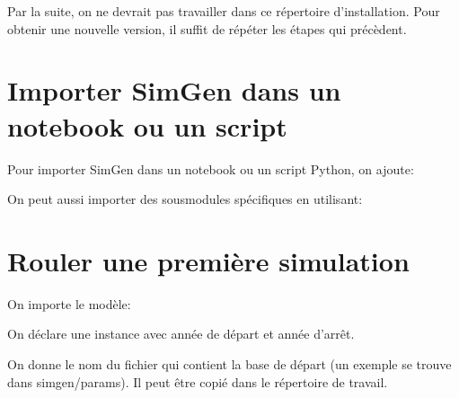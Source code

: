 \documentclass[letterpaper,10pt,french]{sphinxmanual}
\begin{document}
Par la suite, on ne devrait pas travailler dans ce répertoire d’installation. Pour obtenir une nouvelle version, il suffit de répéter les étapes qui précèdent.


\section{Importer SimGen dans un notebook ou un script}
\label{\detokenize{premierpas:importer-simgen-dans-un-notebook-ou-un-script}}
Pour importer SimGen dans un notebook ou un script Python, on ajoute:

\begin{sphinxVerbatim}[commandchars=\\\{\}]
 
\end{sphinxVerbatim}

On peut aussi importer des sous\sphinxhyphen{}modules spécifiques en utilisant:

\begin{sphinxVerbatim}[commandchars=\\\{\}]
     
\end{sphinxVerbatim}


\section{Rouler une première simulation}
\label{\detokenize{premierpas:rouler-une-premiere-simulation}}
On importe le modèle:

\begin{sphinxVerbatim}[commandchars=\\\{\}]
   
\end{sphinxVerbatim}

On déclare une instance avec année de départ et année d’arrêt.

\begin{sphinxVerbatim}[commandchars=\\\{\}]
  
\end{sphinxVerbatim}

On donne le nom du fichier  qui contient la base de départ (un exemple se trouve dans simgen/params). Il peut être copié dans le répertoire de travail.
\end{document}
